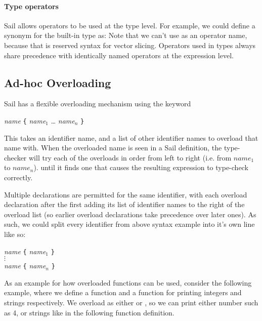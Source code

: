 \paragraph{Type operators}
Sail allows operators to be used at the type level. For example, we
could define a synonym for the built-in  type as:
 Note that we can't use
 as an operator name, because that is reserved syntax for
vector slicing. Operators used in types always share precedence with
identically named operators at the expression level.

\subsection{Ad-hoc Overloading}
\label{sec:overload}

Sail has a flexible overloading mechanism using the 
keyword
\begin{center}
   \textit{name} \ll{=} \lstinline+{+ \textit{name}$_1$ \ll{,} \ldots \ll{,} \textit{name}$_n$ \lstinline+}+
\end{center}
This takes an identifier name, and a list of other identifier names to
overload that name with. When the overloaded name is seen in a Sail
definition, the type-checker will try each of the overloads in order
from left to right (i.e. from $\textit{name}_1$ to $\textit{name}_n$).
until it finds one that causes the resulting expression to type-check
correctly.

Multiple  declarations are permitted for the same
identifier, with each overload declaration after the first adding its
list of identifier names to the right of the overload list (so earlier
overload declarations take precedence over later ones). As such, we
could split every identifier from above syntax example into it's own
line like so:
\begin{center}
   \textit{name} \ll{=} \lstinline+{+ \textit{name}$_1$ \lstinline+}+\\
  $\vdots$\\
   \textit{name} \ll{=} \lstinline+{+ \textit{name}$_n$ \lstinline+}+
\end{center}

As an example for how overloaded functions can be used, consider the
following example, where we define a function  and a
function  for printing integers and strings
respectively. We overload  as either  or
, so we can print either number such as 4, or strings
like  in the following  function
definition.

